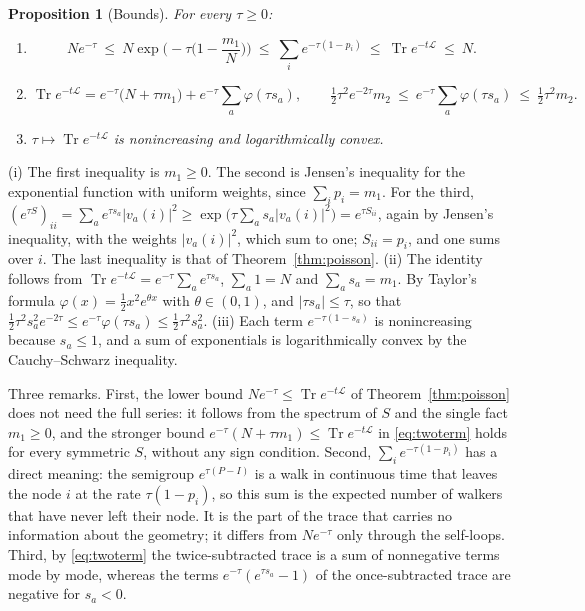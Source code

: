 \documentclass[11pt,a4paper]{article}
\makeatletter
\theoremstyle{stmt}
\newtheorem{proposition}[theorem]{Proposition}
\theoremstyle{defn}
\theoremstyle{rmk}
\renewenvironment{proof}[1][\proofname]{\par\pushQED{\qed}\normalfont\topsep6\p@\@plus6\p@\relax
  \trivlist\item[\hskip\labelsep{\sffamily\itshape\small #1.}]\ignorespaces}{\popQED\endtrivlist\@endpefalse}
\numberwithin{equation}{section}
\DeclareMathOperator{\Tr}{Tr}
\newcommand{\Lc}{\mathcal{L}}
\makeatother
\begin{document}
{\begin{proposition}[Bounds]\label{prop:heatbounds}
For every $\tau\ge0$:
\begin{enumerate}[label=\textup{(\roman*)}]
\item
\begin{equation}\label{eq:chain}
Ne^{-\tau}\ \le\ N\exp\!\Big(-\tau\Big(1-\frac{m_1}{N}\Big)\Big)\ \le\ \sum_ie^{-\tau(1-p_i)}\ \le\ \Tr e^{-t\Lc}\ \le\ N .
\end{equation}
\item
\begin{equation}\label{eq:twoterm}
\Tr e^{-t\Lc}=e^{-\tau}\big(N+\tau m_1\big)+e^{-\tau}\sum_a\varphi(\tau s_a),\qquad
\tfrac12\tau^2e^{-2\tau}m_2\ \le\ e^{-\tau}\sum_a\varphi(\tau s_a)\ \le\ \tfrac12\tau^2m_2 .
\end{equation}
\item $\tau\mapsto\Tr e^{-t\Lc}$ is nonincreasing and logarithmically convex.
\end{enumerate}
\end{proposition}

\begin{proof}
(i) The first inequality is $m_1\ge0$. The second is Jensen's inequality for the exponential function with uniform weights, since $\sum_ip_i=m_1$. For the third, $(e^{\tau S})_{ii}=\sum_ae^{\tau s_a}|v_a(i)|^2\ge\exp\big(\tau\sum_as_a|v_a(i)|^2\big)=e^{\tau S_{ii}}$, again by Jensen's inequality, with the weights $|v_a(i)|^2$, which sum to one; $S_{ii}=p_i$, and one sums over $i$. The last inequality is that of Theorem~\ref{thm:poisson}. (ii) The identity follows from $\Tr e^{-t\Lc}=e^{-\tau}\sum_ae^{\tau s_a}$, $\sum_a1=N$ and $\sum_as_a=m_1$. By Taylor's formula $\varphi(x)=\tfrac12x^2e^{\theta x}$ with $\theta\in(0,1)$, and $|\tau s_a|\le\tau$, so that $\tfrac12\tau^2s_a^2e^{-2\tau}\le e^{-\tau}\varphi(\tau s_a)\le\tfrac12\tau^2s_a^2$. (iii) Each term $e^{-\tau(1-s_a)}$ is nonincreasing because $s_a\le1$, and a sum of exponentials is logarithmically convex by the Cauchy--Schwarz inequality.
\end{proof}

Three remarks. First, the lower bound $Ne^{-\tau}\le\Tr e^{-t\Lc}$ of Theorem~\ref{thm:poisson} does not need the full series: it follows from the spectrum of $S$ and the single fact $m_1\ge0$, and the stronger bound $e^{-\tau}(N+\tau m_1)\le\Tr e^{-t\Lc}$ in \eqref{eq:twoterm} holds for every symmetric $S$, without any sign condition. Second, $\sum_ie^{-\tau(1-p_i)}$ has a direct meaning: the semigroup $e^{\tau(P-I)}$ is a walk in continuous time that leaves the node $i$ at the rate $\tau(1-p_i)$, so this sum is the expected number of walkers that have never left their node. It is the part of the trace that carries no information about the geometry; it differs from $Ne^{-\tau}$ only through the self-loops. Third, by \eqref{eq:twoterm} the twice-subtracted trace is a sum of nonnegative terms mode by mode, whereas the terms $e^{-\tau}(e^{\tau s_a}-1)$ of the once-subtracted trace are negative for $s_a<0$.

}
\end{document}
